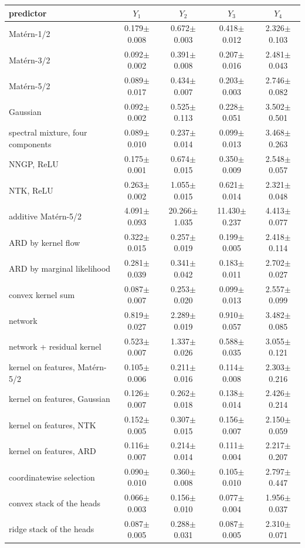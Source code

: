 \begin{tabular}{lcccc}
\toprule
predictor & $Y_1$ & $Y_2$ & $Y_3$ & $Y_4$ \\
\midrule
Mat\'ern-1/2 & 0.179$\pm$0.008 & 0.672$\pm$0.003 & 0.418$\pm$0.012 & 2.326$\pm$0.103 \\
Mat\'ern-3/2 & 0.092$\pm$0.002 & 0.391$\pm$0.008 & 0.207$\pm$0.016 & 2.481$\pm$0.043 \\
Mat\'ern-5/2 & 0.089$\pm$0.017 & 0.434$\pm$0.007 & 0.203$\pm$0.003 & 2.746$\pm$0.082 \\
Gaussian & 0.092$\pm$0.002 & 0.525$\pm$0.113 & 0.228$\pm$0.051 & 3.502$\pm$0.501 \\
spectral mixture, four components & 0.089$\pm$0.010 & 0.237$\pm$0.014 & 0.099$\pm$0.013 & 3.468$\pm$0.263 \\
NNGP, ReLU & 0.175$\pm$0.001 & 0.674$\pm$0.015 & 0.350$\pm$0.009 & 2.548$\pm$0.057 \\
NTK, ReLU & 0.263$\pm$0.002 & 1.055$\pm$0.015 & 0.621$\pm$0.014 & 2.321$\pm$0.048 \\
additive Mat\'ern-5/2 & 4.091$\pm$0.093 & 20.266$\pm$1.035 & 11.430$\pm$0.237 & 4.413$\pm$0.077 \\
ARD by kernel flow & 0.322$\pm$0.015 & 0.257$\pm$0.019 & 0.199$\pm$0.005 & 2.418$\pm$0.114 \\
ARD by marginal likelihood & 0.281$\pm$0.039 & 0.341$\pm$0.042 & 0.183$\pm$0.011 & 2.702$\pm$0.027 \\
\midrule
convex kernel sum & 0.087$\pm$0.007 & 0.253$\pm$0.020 & 0.099$\pm$0.013 & 2.557$\pm$0.099 \\
\midrule
network & 0.819$\pm$0.027 & 2.289$\pm$0.019 & 0.910$\pm$0.057 & 3.482$\pm$0.085 \\
network + residual kernel & 0.523$\pm$0.007 & 1.337$\pm$0.026 & 0.588$\pm$0.035 & 3.055$\pm$0.121 \\
kernel on features, Mat\'ern-5/2 & 0.105$\pm$0.006 & 0.211$\pm$0.016 & 0.114$\pm$0.008 & 2.303$\pm$0.216 \\
kernel on features, Gaussian & 0.126$\pm$0.007 & 0.262$\pm$0.018 & 0.138$\pm$0.014 & 2.426$\pm$0.214 \\
kernel on features, NTK & 0.152$\pm$0.005 & 0.307$\pm$0.015 & 0.156$\pm$0.007 & 2.150$\pm$0.059 \\
kernel on features, ARD & 0.116$\pm$0.007 & 0.214$\pm$0.014 & 0.111$\pm$0.004 & 2.217$\pm$0.207 \\
\midrule
coordinatewise selection & 0.090$\pm$0.010 & 0.360$\pm$0.008 & 0.105$\pm$0.010 & 2.797$\pm$0.447 \\
convex stack of the heads & 0.066$\pm$0.003 & 0.156$\pm$0.010 & 0.077$\pm$0.004 & 1.956$\pm$0.037 \\
ridge stack of the heads & 0.087$\pm$0.005 & 0.288$\pm$0.031 & 0.087$\pm$0.005 & 2.310$\pm$0.071 \\
\bottomrule
\end{tabular}
